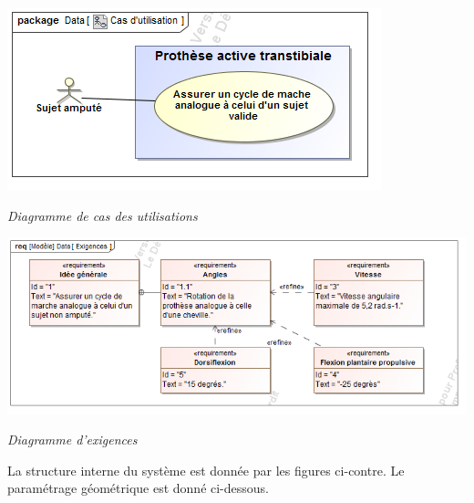 \documentclass[10pt]{article}
\begin{document}
\begin{minipage}[c]{.33\linewidth}
\begin{center}
\includegraphics[width=\textwidth]{images/uc}

\textit{Diagramme de cas des utilisations}
\end{center}
\end{minipage} \hfill
\begin{minipage}[c]{.63\linewidth}
\begin{center}
\includegraphics[width=\textwidth]{images/exigences}

\textit{Diagramme d'exigences}
\end{center}
\end{minipage}

\vspace{.25cm}

La structure interne du système est donnée par les figures ci-contre. Le paramétrage géométrique est donné ci-dessous.

\vspace{.25cm}
\end{document}
